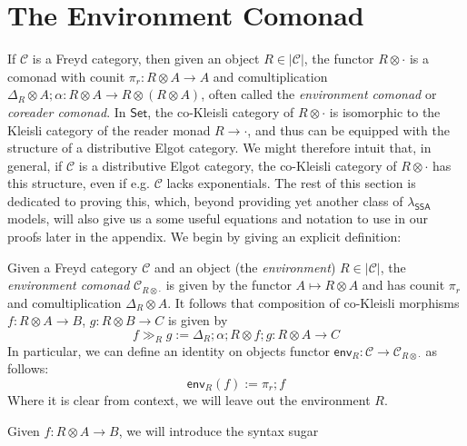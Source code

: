 \documentclass[acmsmall,screen,review]{acmart}
\newcommand{\mc}[1]{\ensuremath{\mathcal{#1}}}
\newcommand{\ms}[1]{\ensuremath{\mathsf{#1}}}
\newcommand{\dmor}[1]{{\Delta}_{#1}}
\newcommand{\envcom}[2]{{#1}_{#2 \otimes \cdot}}
\newcommand{\rseq}[3]{#2 \gg_{#1} #3}
\newcommand{\toenv}[2]{\ms{env}_{#1}(#2)}
\newcommand{\isotopessa}{\(\lambda_{\ms{SSA}}\)}
\begin{document}



\clearpage 

\appendix

\section{The Environment Comonad}

\label{apx:environment}

If $\mc{C}$ is a Freyd category, then given an object $R \in |\mc{C}|$, the functor $R \otimes
\cdot$ is a comonad with counit $\pi_r : R \otimes A \to A$ and comultiplication $\dmor{R} \otimes A
; \alpha : R \otimes A \to R \otimes (R \otimes A)$, often called the \emph{environment comonad} or
\emph{coreader comonad}. In $\ms{Set}$, the co-Kleisli category of $R \otimes \cdot$ is isomorphic
to the Kleisli category of the reader monad $R \to \cdot$, and thus can be equipped with the
structure of a distributive Elgot category. We might therefore intuit that, in general, if $\mc{C}$
is a distributive Elgot category, the co-Kleisli category of $R \otimes \cdot$ has this structure,
even if e.g. $\mc{C}$ lacks exponentials. The rest of this section is dedicated to proving this,
which, beyond providing yet another class of \isotopessa{} models, will also give us a some useful
equations and notation to use in our proofs later in the appendix.
%
We begin by giving an explicit definition:
\begin{definition}
  Given a Freyd category $\mc{C}$ and an object (the \emph{environment}) $R \in |\mc{C}|$, the
  \emph{environment comonad} $\envcom{\mc{C}}{R}$ is given by the functor $A \mapsto R \otimes A$
  and has counit $\pi_r$ and comultiplication $\Delta_R \otimes A$. It follows that composition of
  co-Kleisli morphisms $f : R \otimes A \to B$, $g : R \otimes B \to C$ is given by
  \begin{equation}
    \rseq{R}{f}{g} := \dmor{R} ; \alpha ; R \otimes f ; g : R \otimes A \to C
  \end{equation}
  In particular, we can define an identity on objects functor $\ms{env}_R : \mc{C} \to
  \envcom{\mc{C}}{R}$ as follows:
  \begin{equation}
    \toenv{R}{f} := \pi_r ; f
  \end{equation}
  Where it is clear from context, we will leave out the environment $R$.
\end{definition}
%
Given $f : R \otimes A \to B$, we will introduce the syntax sugar
\end{document}
